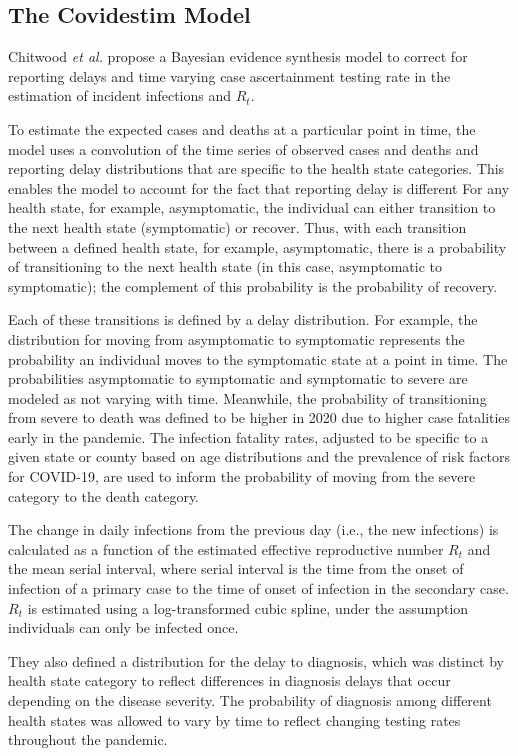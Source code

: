 \documentclass[12pt,twoside]{smiththesis}
\begin{document}
\hypertarget{the-covidestim-model}{%
\subsection{The Covidestim Model}\label{the-covidestim-model}}

Chitwood \emph{et al.} propose a Bayesian evidence synthesis model to correct for reporting delays and time varying case ascertainment testing rate in the estimation of incident infections and \(R_t\).

To estimate the expected cases and deaths at a particular point in time, the model uses a convolution of the time series of observed cases and deaths and reporting delay distributions that are specific to the health state categories. This enables the model to account for the fact that reporting delay is different For any health state, for example, asymptomatic, the individual can either transition to the next health state (symptomatic) or recover. Thus, with each transition between a defined health state, for example, asymptomatic, there is a probability of transitioning to the next health state (in this case, asymptomatic to symptomatic); the complement of this probability is the probability of recovery.

Each of these transitions is defined by a delay distribution. For example, the distribution for moving from asymptomatic to symptomatic represents the probability an individual moves to the symptomatic state at a point in time. The probabilities asymptomatic to symptomatic and symptomatic to severe are modeled as not varying with time. Meanwhile, the probability of transitioning from severe to death was defined to be higher in 2020 due to higher case fatalities early in the pandemic. The infection fatality rates, adjusted to be specific to a given state or county based on age distributions and the prevalence of risk factors for COVID-19, are used to inform the probability of moving from the severe category to the death category.

The change in daily infections from the previous day (i.e., the new infections) is calculated as a function of the estimated effective reproductive number \(R_t\) and the mean serial interval, where serial interval is the time from the onset of infection of a primary case to the time of onset of infection in the secondary case. \(R_t\) is estimated using a log-transformed cubic spline, under the assumption individuals can only be infected once.

They also defined a distribution for the delay to diagnosis, which was distinct by health state category to reflect differences in diagnosis delays that occur depending on the disease severity.
The probability of diagnosis among different health states was allowed to vary by time to reflect changing testing rates throughout the pandemic.
\end{document}
